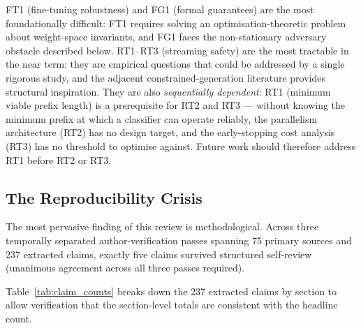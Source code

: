 FT1 (fine-tuning robustness) and FG1 (formal guarantees) are the most foundationally difficult: FT1 requires solving an optimisation-theoretic problem about weight-space invariants, and FG1 faces the non-stationary adversary obstacle described below.
RT1--RT3 (streaming safety) are the most tractable in the near term: they are empirical questions that could be addressed by a single rigorous study, and the adjacent constrained-generation literature provides structural inspiration.
They are also \emph{sequentially dependent}: RT1 (minimum viable prefix length) is a prerequisite for RT2 and RT3 --- without knowing the minimum prefix at which a classifier can operate reliably, the parallelism architecture (RT2) has no design target, and the early-stopping cost analysis (RT3) has no threshold to optimise against.
Future work should therefore address RT1 before RT2 or RT3.

\subsection{The Reproducibility Crisis}
\label{subsec:reproducibility}

The most pervasive finding of this review is methodological.
Across three temporally separated author-verification passes spanning 75 primary
sources and 237 extracted claims, exactly five claims survived structured self-review
(unanimous agreement across all three passes required).

Table~\ref{tab:claim_counts} breaks down the 237 extracted claims by section to
allow verification that the section-level totals are consistent with the headline
count.

